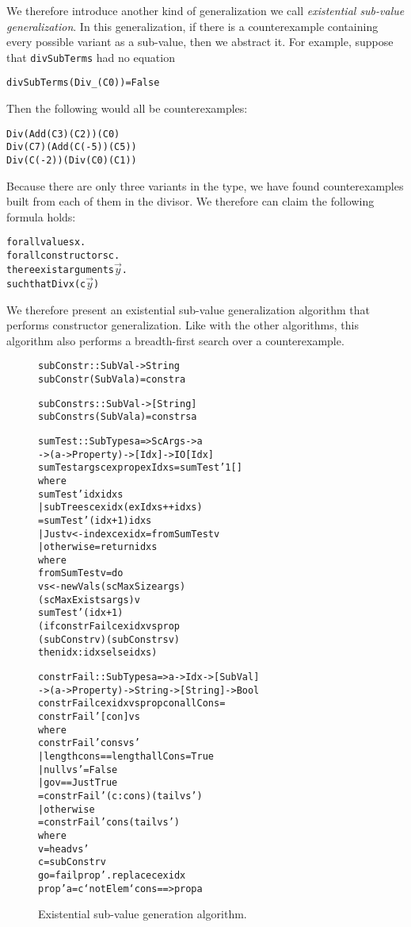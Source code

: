 \documentclass{sigplanconf}
\newenvironment{code}{\begin{alltt}\footnotesize}{\end{alltt}}
\newcommand{\ttp}[1]{\texttt{#1}}
\begin{document}
We therefore introduce another kind of generalization we call \emph{existential
  sub-value generalization}.  In this generalization, if there is a
counterexample containing every possible variant as a sub-value, then we
abstract it.  For example, suppose that \ttp{divSubTerms} had no equation
%
\begin{code}
divSubTerms (Div _ (C 0)) = False
\end{code}
%
\noindent
Then the following would all be counterexamples:
%
\begin{code}
Div (Add (C 3) (C 2)) (C 0)
Div (C 7) (Add (C (-5)) (C 5))
Div (C (-2)) (Div (C 0) (C 1))
\end{code}
%
\noindent
Because there are only three variants in the type, we have found counterexamples
built from each of them in the divisor.  We therefore can claim the following
formula holds:
%
\begin{code}
forall values x .
  forall constructors c .
    there exist arguments \(\stackrel{\rightarrow}{y}\) .
      such that Div x (c\(\stackrel{\rightarrow}{y}\))
\end{code}
%
\noindent
We therefore present an existential sub-value generalization algorithm that
performs constructor generalization.  Like with the other algorithms, this
algorithm also performs a breadth-first search over a counterexample.

\begin{figure}
  \begin{code}
subConstr :: SubVal -> String
subConstr (SubVal a) = constr a

subConstrs :: SubVal -> [String]
subConstrs (SubVal a) = constrs a

sumTest :: SubTypes a => ScArgs -> a
  -> (a -> Property) -> [Idx] -> IO [Idx]
sumTest args cex prop exIdxs = sumTest' 1 []
  where
  sumTest' idx idxs
    | subTrees cex idx (exIdxs ++ idxs)
    = sumTest' (idx+1) idxs
    | Just v <- index cex idx = fromSumTest v
    | otherwise = return idxs
    where
    fromSumTest v = do
      vs <- newVals (scMaxSize args)
              (scMaxExists args) v
      sumTest' (idx+1)
        (if constrFail cex idx vs prop
           (subConstr v) (subConstrs v)
           then idx:idxs else idxs)

constrFail :: SubTypes a => a -> Idx -> [SubVal]
  -> (a -> Property) -> String -> [String] -> Bool
constrFail cex idx vs prop con allCons =
  constrFail' [con] vs
  where
  constrFail' cons vs'
    | length cons == length allCons = True
    | null vs'                      = False
    | go v == Just True
    = constrFail' (c:cons) (tail vs')
    | otherwise
    = constrFail' cons (tail vs')
    where
    v  = head vs'
    c  = subConstr v
    go = fail prop' . replace cex idx
    prop' a = c `notElem` cons ==> prop a
  \end{code}
  \caption{Existential sub-value generation algorithm.}
  \label{fig:constrs}
\end{figure}
\end{document}
